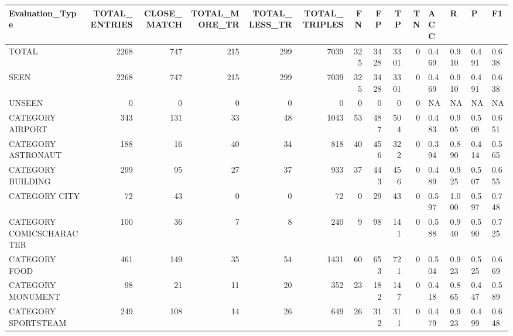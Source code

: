 \begin{tabular}{lrrrrrrrrrllll}
\hline
 Evaluation\_Type          &   TOTAL\_ENTRIES &   CLOSE\_MATCH &   TOTAL\_MORE\_TR &   TOTAL\_LESS\_TR &   TOTAL\_TRIPLES &   FN &   FP &   TP &   TN & ACC   & R     & P     & F1    \\
\hline
 TOTAL                    &            2268 &           747 &             215 &             299 &            7039 &  325 & 3428 & 3301 &    0 & 0.469 & 0.910 & 0.491 & 0.638 \\
 SEEN                     &            2268 &           747 &             215 &             299 &            7039 &  325 & 3428 & 3301 &    0 & 0.469 & 0.910 & 0.491 & 0.638 \\
 UNSEEN                   &               0 &             0 &               0 &               0 &               0 &    0 &    0 &    0 &    0 & NA    & NA    & NA    & NA    \\
 CATEGORY AIRPORT         &             343 &           131 &              33 &              48 &            1043 &   53 &  487 &  504 &    0 & 0.483 & 0.905 & 0.509 & 0.651 \\
 CATEGORY ASTRONAUT       &             188 &            16 &              40 &              34 &             818 &   40 &  456 &  322 &    0 & 0.394 & 0.890 & 0.414 & 0.565 \\
 CATEGORY BUILDING        &             299 &            95 &              27 &              37 &             933 &   37 &  443 &  456 &    0 & 0.489 & 0.925 & 0.507 & 0.655 \\
 CATEGORY CITY            &              72 &            43 &               0 &               0 &              72 &    0 &   29 &   43 &    0 & 0.597 & 1.000 & 0.597 & 0.748 \\
 CATEGORY COMICSCHARACTER &             100 &            36 &               7 &               8 &             240 &    9 &   98 &  141 &    0 & 0.588 & 0.940 & 0.590 & 0.725 \\
 CATEGORY FOOD            &             461 &           149 &              35 &              54 &            1431 &   60 &  653 &  721 &    0 & 0.504 & 0.923 & 0.525 & 0.669 \\
 CATEGORY MONUMENT        &              98 &            21 &              11 &              20 &             352 &   23 &  182 &  147 &    0 & 0.418 & 0.865 & 0.447 & 0.589 \\
 CATEGORY SPORTSTEAM      &             249 &           108 &              14 &              26 &             649 &   26 &  312 &  311 &    0 & 0.479 & 0.923 & 0.499 & 0.648 \\

\end{tabular}
